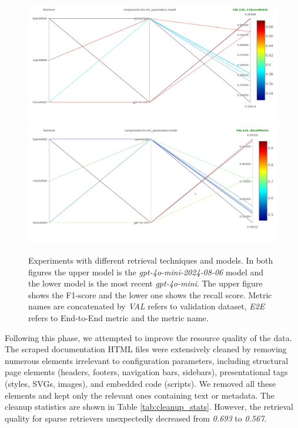\begin{figure}[!ht]
    \centering
    \includegraphics[width=\textwidth]{images/RetrievalTypes-vs-LLM-f1.png}\\[6pt]
    \includegraphics[width=\textwidth]{images/RetrievalTypes-vs-LLM-Recall.png}
    \caption{Experiments with different retrieval techniques and models. In both figures the upper model is the \textit{gpt-4o-mini-2024-08-06} model and the lower model is the most recent \textit{gpt-4o-mini}. The upper figure shows the F1-score and the lower one shows the recall score. Metric names are concatenated by \textit{VAL} refers to validation dataset, \textit{E2E} refers to End-to-End metric and the metric name.}
    \label{fig:conf-phase-0-retrievers}
\end{figure}

Following this phase, we attempted to improve the resource quality of the data. The scraped documentation HTML files were extensively cleaned by removing numerous elements irrelevant to configuration parameters, including structural page elements (headers, footers, navigation bars, sidebars), presentational tags (styles, SVGs, images), and embedded code (scripts). We removed all these elements and kept only the relevant ones containing text or metadata. The cleanup statistics are shown in Table \ref{tab:cleanup_stats}. However, the retrieval quality for sparse retrievers unexpectedly decreased from \textit{0.693} to \textit{0.567}.

